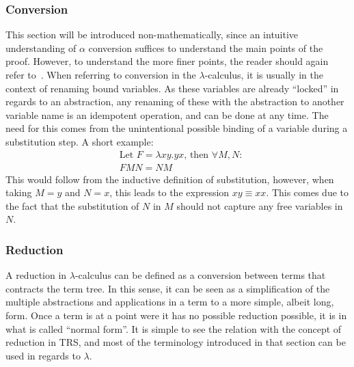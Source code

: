 \documentclass[12pt]{article}
\begin{document}
\subsubsection{Conversion}
This section will be introduced non-mathematically, since an intuitive understanding of $\alpha$ conversion suffices to understand the main points of the proof. However, to understand the more finer points, the reader should again refer to~\cite{barendregt1984lambda}.
When referring to conversion in the $\lambda$-calculus, it is usually in the context of renaming bound variables. As these variables are already \enquote{locked} in regards to an abstraction, any renaming of these with the abstraction to another variable name is an idempotent operation, and can be done at any time.
The need for this comes from the unintentional possible binding of a variable during a substitution step. A short example:
\begin{equation}
  \begin{split}
    & \text{Let } F = \lambda xy.yx \text{, then } \forall M, N: \\
    & FMN = NM
  \end{split}
\end{equation}
This would follow from the inductive definition of substitution, however, when taking $M = y$ and $N = x$, this leads to the expression $xy \equiv xx$.
This comes due to the fact that the substitution of $N$ in $M$ should not capture any free variables in $N$.
\subsubsection{Reduction}\label{reduction}
A reduction in $\lambda$-calculus can be defined as a conversion between terms that contracts the term tree. In this sense, it can be seen as a simplification of the multiple abstractions and applications in a term to a more simple, albeit long, form. Once a term is at a point were it has no possible reduction possible, it is in what is called \enquote{normal form}.
It is simple to see the relation with the concept of reduction in TRS, and most of the terminology introduced in that section can be used in regards to $\lambda$.
\end{document}
